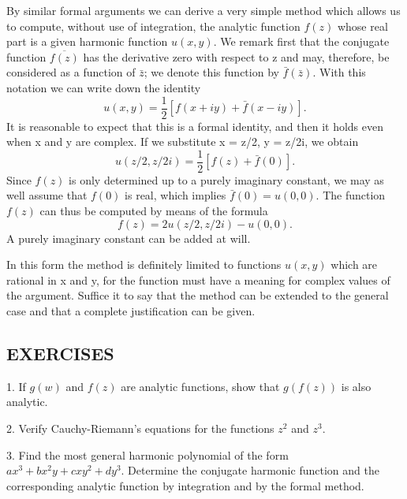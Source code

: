 By similar formal arguments we can derive a very simple method which allows us to compute, without use of integration, the analytic function $f(z)$ whose real part is a given harmonic function $u(x,y)$. We remark first that the conjugate function $\overline{f(z)}$ has the derivative zero with respect to z and may, therefore, be considered as a function of $\bar{z}$; we denote this function by $\bar{f}(\bar{z})$. With this notation we can write down the identity
\begin{equation*}
u (x, y) = \frac {1}{2} [ f (x + i y) + \bar {f} (x - i y) ].
\end{equation*}
It is reasonable to expect that this is a formal identity, and then it holds even when x and y are complex. If we substitute x = z/2, y = z/2i, we obtain
\begin{equation*}
u (z / 2, z / 2 i) = \frac {1}{2} [ f (z) + \bar {f} (0) ].
\end{equation*}
Since $f(z)$ is only determined up to a purely imaginary constant, we may as well assume that $f(0)$ is real, which implies $\bar{f}(0) = u(0,0)$. The function $f(z)$ can thus be computed by means of the formula
\begin{equation*}
f (z) = 2 u (z / 2, z / 2 i) - u (0, 0).
\end{equation*}
A purely imaginary constant can be added at will.

In this form the method is definitely limited to functions $u(x,y)$ which
are rational in x and y, for the function must have a meaning for complex values of the argument. Suffice it to say that the method can be extended to the general case and that a complete justification can be given.

\subsection*{EXERCISES}
1. If $g(w)$ and $f(z)$ are analytic functions, show that $g(f(z))$ is also analytic.

2. Verify Cauchy-Riemann's equations for the functions $z^2$ and $z^3$.

3. Find the most general harmonic polynomial of the form $ax^{3} + bx^{2}y + cxy^{2} + dy^{3}$. Determine the conjugate harmonic function and the corresponding analytic function by integration and by the formal method.

